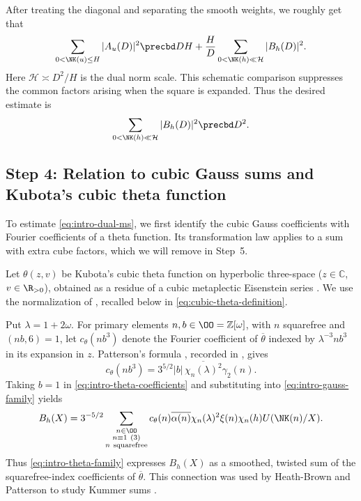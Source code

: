  After treating the diagonal and separating the smooth weights, we roughly get that
\begin{equation}\label{eq:intro-poisson-comparison}
 \sum_{0<\NK(u)\le H}|A_u(D)|^2
 \precbd DH+\frac HD
       \sum_{0<\NK(h)\ll\mathcal H}|B_h(D)|^2.
\end{equation}
Here $\mathcal H\asymp D^2/H$ is the dual norm scale. This schematic
comparison suppresses the common factors arising when the square is
expanded. Thus the desired estimate is
\begin{equation}\label{eq:intro-dual-ms}
 \sum_{0<\NK(h)\ll\mathcal H}|B_h(D)|^2\precbd D^2.
\end{equation}

\subsection{Step 4: \texorpdfstring{Relation}{Relation} to cubic Gauss sums and Kubota's cubic theta function}

To estimate \eqref{eq:intro-dual-ms}, we first identify the cubic
Gauss coefficients with Fourier coefficients of a theta function.
Its transformation law applies to a sum with extra cube factors,
which we will remove in Step~5.

Let $\theta(z,v)$ be Kubota's cubic theta function on hyperbolic three-space ($z\in\mathbb C$, $v \in \R_{>0}$), obtained as a residue of a cubic metaplectic Eisenstein series \cite{Kub69,Pat77}. We use the normalization of \cite[\S5.1, (5.6)--(5.8)]{DR},
recalled below in \eqref{eq:cubic-theta-definition}.

Put $\lambda=1+2\omega$. For primary elements $n,b\in\OO=\mathbb Z[\omega]$, 
with $n$ squarefree and $(nb,6)=1$, let $c_\theta(nb^3)$ denote the Fourier coefficient of $\overline\theta$ indexed by $\lambda^{-3}nb^3$ in its expansion in $z$. Patterson's formula \cite[Theorem~8.1]{Pat77}, recorded in \cite[(5.7)]{DR}, gives
\begin{equation}\label{eq:intro-theta-coefficients}
 c_\theta(nb^3)
     =3^{5/2}|b|\,\overline{\chi_n(\lambda)^2}\gamma_2(n).
\end{equation}
Taking $b=1$ in \eqref{eq:intro-theta-coefficients} and substituting into \eqref{eq:intro-gauss-family} yields
\begin{equation}\label{eq:intro-theta-family}
 B_h(X)=3^{-5/2}\sum_{\substack{n\in\OO\\n\equiv1\ (3)\\n\ {\rm squarefree}}}
 c_\theta(n)\overline{\alpha(n)}\chi_n(\lambda)^2
 \xi(n)\chi_n(h)U(\NK(n)/X).
\end{equation}
Thus \eqref{eq:intro-theta-family} expresses $B_h(X)$ as a smoothed, twisted sum of the squarefree-index coefficients of $\overline\theta$. This connection was used by Heath-Brown and Patterson to study Kummer sums \cite{HBP79}.


